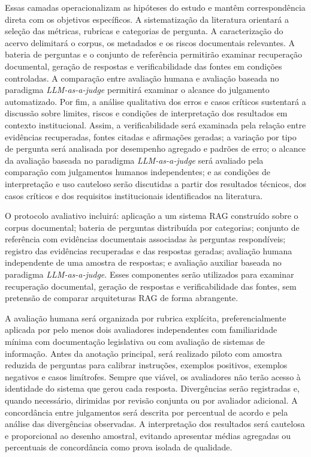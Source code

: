 Essas camadas operacionalizam as hipóteses do estudo e mantêm correspondência direta com os objetivos específicos. A sistematização da literatura orientará a seleção das métricas, rubricas e categorias de pergunta. A caracterização do acervo delimitará o corpus, os metadados e os riscos documentais relevantes. A bateria de perguntas e o conjunto de referência permitirão examinar recuperação documental, geração de respostas e verificabilidade das fontes em condições controladas. A comparação entre avaliação humana e avaliação baseada no paradigma \textit{LLM-as-a-judge} permitirá examinar o alcance do julgamento automatizado. Por fim, a análise qualitativa dos erros e casos críticos sustentará a discussão sobre limites, riscos e condições de interpretação dos resultados em contexto institucional. Assim, a verificabilidade será examinada pela relação entre evidências recuperadas, fontes citadas e afirmações geradas; a variação por tipo de pergunta será analisada por desempenho agregado e padrões de erro; o alcance da avaliação baseada no paradigma \textit{LLM-as-a-judge} será avaliado pela comparação com julgamentos humanos independentes; e as condições de interpretação e uso cauteloso serão discutidas a partir dos resultados técnicos, dos casos críticos e dos requisitos institucionais identificados na literatura.

O protocolo avaliativo incluirá: aplicação a um sistema RAG construído sobre o corpus documental; bateria de perguntas distribuída por categorias; conjunto de referência com evidências documentais associadas às perguntas respondíveis; registro das evidências recuperadas e das respostas geradas; avaliação humana independente de uma amostra de respostas; e avaliação auxiliar baseada no paradigma \textit{LLM-as-a-judge}. Esses componentes serão utilizados para examinar recuperação documental, geração de respostas e verificabilidade das fontes, sem pretensão de comparar arquiteturas RAG de forma abrangente.

A avaliação humana será organizada por rubrica explícita, preferencialmente aplicada por pelo menos dois avaliadores independentes com familiaridade mínima com documentação legislativa ou com avaliação de sistemas de informação. Antes da anotação principal, será realizado piloto com amostra reduzida de perguntas para calibrar instruções, exemplos positivos, exemplos negativos e casos limítrofes. Sempre que viável, os avaliadores não terão acesso à identidade do sistema que gerou cada resposta. Divergências serão registradas e, quando necessário, dirimidas por revisão conjunta ou por avaliador adicional. A concordância entre julgamentos será descrita por percentual de acordo e pela análise das divergências observadas. A interpretação dos resultados será cautelosa e proporcional ao desenho amostral, evitando apresentar médias agregadas ou percentuais de concordância como prova isolada de qualidade.

